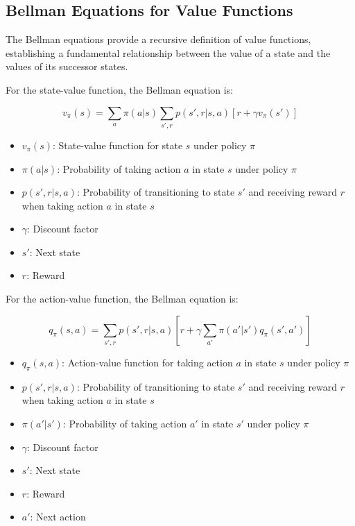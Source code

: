 \documentclass{article}
\begin{document}
\subsection{Bellman Equations for Value Functions}

The Bellman equations provide a recursive definition of value functions, establishing a fundamental relationship between the value of a state and the values of its successor states.

For the state-value function, the Bellman equation is:

\begin{equation}
v_\pi(s) = \sum_a \pi(a|s) \sum_{s',r} p(s',r|s,a)[r + \gamma v_\pi(s')]
\end{equation}

\begin{tcolorbox}[colframe=blue!50!black, colback=blue!10, title=Notation Overview]
\begin{itemize}
    \item $v_\pi(s)$: State-value function for state $s$ under policy $\pi$
    \item $\pi(a|s)$: Probability of taking action $a$ in state $s$ under policy $\pi$
    \item $p(s',r|s,a)$: Probability of transitioning to state $s'$ and receiving reward $r$ when taking action $a$ in state $s$
    \item $\gamma$: Discount factor
    \item $s'$: Next state
    \item $r$: Reward
\end{itemize}
\end{tcolorbox}

For the action-value function, the Bellman equation is:

\begin{equation}
q_\pi(s,a) = \sum_{s',r} p(s',r|s,a)[r + \gamma \sum_{a'} \pi(a'|s')q_\pi(s',a')]
\end{equation}

\begin{tcolorbox}[colframe=blue!50!black, colback=blue!10, title=Notation Overview]
\begin{itemize}
    \item $q_\pi(s,a)$: Action-value function for taking action $a$ in state $s$ under policy $\pi$
    \item $p(s',r|s,a)$: Probability of transitioning to state $s'$ and receiving reward $r$ when taking action $a$ in state $s$
    \item $\pi(a'|s')$: Probability of taking action $a'$ in state $s'$ under policy $\pi$
    \item $\gamma$: Discount factor
    \item $s'$: Next state
    \item $r$: Reward
    \item $a'$: Next action
\end{itemize}
\end{tcolorbox}
\end{document}
